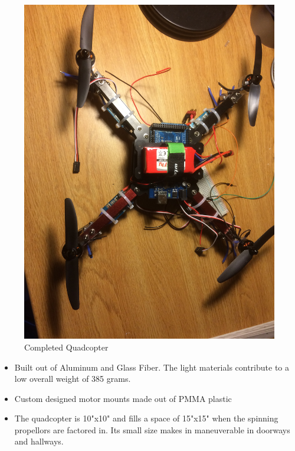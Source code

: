\documentclass{lposter}
\theoremstyle{plain}
\theoremstyle{definition}
\begin{document}
\begin{poster}
\begin{figure}
\centering
\includegraphics[scale=0.2]{quad.jpg}
\caption{Completed Quadcopter\newline}
\label{fig:mig_over}
\end{figure}

\begin{itemize}
\item Built out of Aluminum and Glass Fiber. The light materials contribute to a low overall weight of 385 grams.
\item Custom designed motor mounts made out of PMMA plastic



\item The quadcopter is 10"x10" and fills a space of 15"x15" when the spinning propellors are factored in. Its small size makes in maneuverable in doorways and hallways. 
\end{itemize}



\end{poster}
\end{document}
